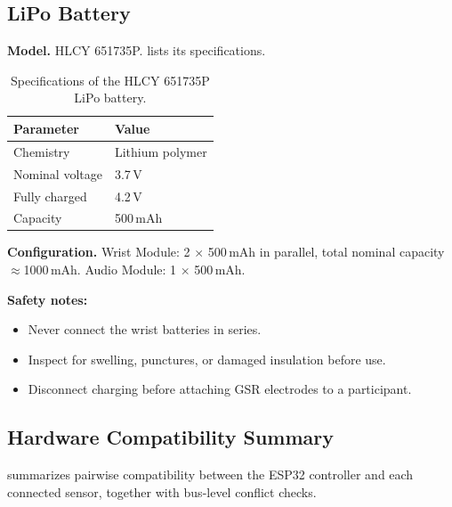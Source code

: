 \subsection{LiPo Battery}
\label{sec:lipo-battery}

\textbf{Model.} HLCY 651735P.  lists its specifications.

\begin{table}[H]
\centering
\caption{Specifications of the HLCY 651735P LiPo battery.}
\label{tab:lipo-specs}
\small
\begin{tabularx}{\columnwidth}{@{}l Y@{}}
\toprule
\textbf{Parameter} & \textbf{Value} \\
\midrule
Chemistry & Lithium polymer \\
Nominal voltage & 3.7\,V \\
Fully charged & 4.2\,V \\
Capacity & 500\,mAh \\
\bottomrule
\end{tabularx}
\end{table}

\textbf{Configuration.} Wrist Module: 2 $\times$ 500\,mAh in parallel, total nominal capacity $\approx$1000\,mAh. Audio Module: 1 $\times$ 500\,mAh.

\begin{warningbox}
\textbf{Safety notes:}
\begin{itemize}
    \item Never connect the wrist batteries in series.
    \item Inspect for swelling, punctures, or damaged insulation before use.
    \item Disconnect charging before attaching GSR electrodes to a participant.
\end{itemize}
\end{warningbox}

\subsection{Hardware Compatibility Summary}
\label{sec:hardware-compatibility}

 summarizes pairwise compatibility between the ESP32 controller and each connected sensor, together with bus-level conflict checks.


